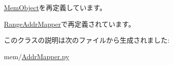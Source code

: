 \hyperlink{classMemObject_1_1MemObject_acce15679d830831b0bbe8ebc2a60b2ca}{MemObject}を再定義しています。

\hyperlink{classAddrMapper_1_1RangeAddrMapper_acce15679d830831b0bbe8ebc2a60b2ca}{RangeAddrMapper}で再定義されています。

このクラスの説明は次のファイルから生成されました:\begin{DoxyCompactItemize}
\item 
mem/\hyperlink{AddrMapper_8py}{AddrMapper.py}\end{DoxyCompactItemize}
